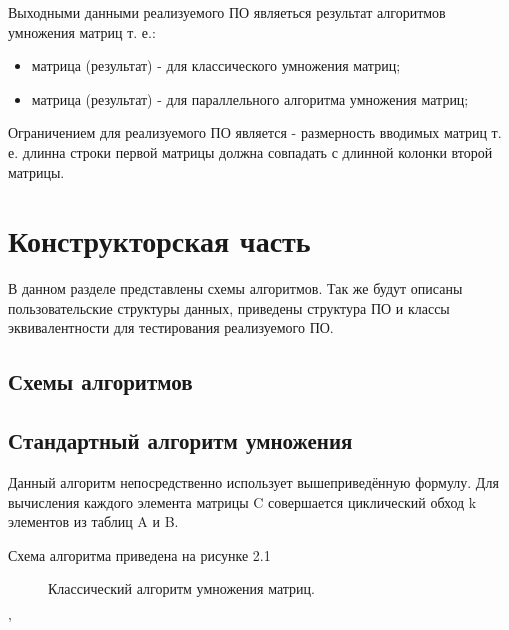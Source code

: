 \documentclass[12pt,a4paper]{report}
\begin{document}
Выходными данными реализуемого ПО являеться результат алгоритмов умножения матриц т. е.:
\begin{itemize}
	\item матрица (результат) - для классического умножения матриц;
	\item матрица (результат) - для параллельного алгоритма умножения матриц;
	
\end{itemize}
Ограничением для реализуемого ПО является - размерность вводимых матриц т. е. длинна строки первой матрицы должна совпадать с длинной колонки второй матрицы.



\newpage
\chapter{Конструкторская часть}

В данном разделе представлены схемы алгоритмов. Так же будут описаны пользовательские структуры данных, приведены структура ПО и классы эквивалентности для тестирования реализуемого ПО.

\section{Схемы алгоритмов}

\section*{Стандартный алгоритм умножения}

Данный алгоритм непосредственно использует вышеприведённую формулу. 
Для вычисления каждого элемента матрицы C совершается циклический обход k элементов из таблиц A и B.

Схема алгоритма приведена на рисунке 2.1

\begin{figure}[ht]
	\caption{Классический алгоритм умножения матриц.}
\end{figure}'
\end{document}
